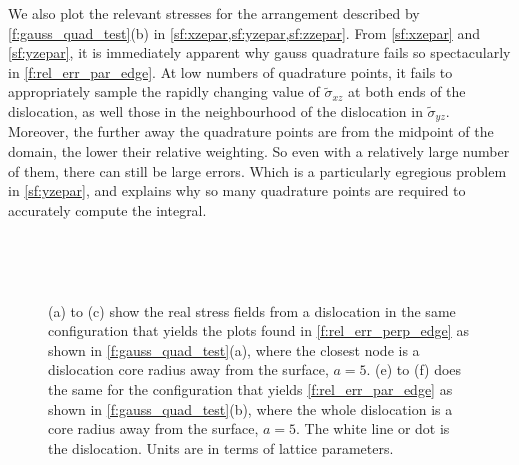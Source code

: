 We also plot the relevant stresses for the arrangement described by \cref{f:gauss_quad_test}(b) in \cref{sf:xzepar,sf:yzepar,sf:zzepar}. From \cref{sf:xzepar} and \cref{sf:yzepar}, it is immediately apparent why gauss quadrature fails so spectacularly in \cref{f:rel_err_par_edge}. At low numbers of quadrature points, it fails to appropriately sample the rapidly changing value of $\tilde{\sigma}_{xz}$ at both ends of the dislocation, as well those in the neighbourhood of the dislocation in $\tilde{\sigma}_{yz}$. Moreover, the further away the quadrature points are from the midpoint of the domain, the lower their relative weighting. So even with a relatively large number of them, there can still be large errors. Which is a particularly egregious problem in \cref{sf:yzepar}, and explains why so many quadrature points are required to accurately compute the integral.
\begin{figure}
    \centering
    ~
    ~

    ~
    ~
    \caption[Symmetry in stress fields leads more accurate numeric tractions.]{(a) to (c) show the real stress fields from a dislocation in the same configuration that yields the plots found in \cref{f:rel_err_perp_edge} as shown in \cref{f:gauss_quad_test}(a), where the closest node is a dislocation core radius away from the surface, $a = 5$. (e) to (f) does the same for the configuration that yields \cref{f:rel_err_par_edge} as shown in \cref{f:gauss_quad_test}(b), where the whole dislocation is a core radius away from the surface, $a = 5$. The white line or dot is the dislocation. Units are in terms of lattice parameters.}
    \label{f:sigma_edge_test_config}
\end{figure}

